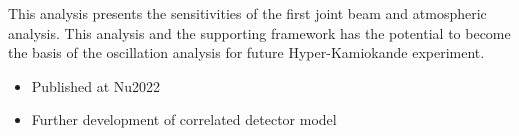 This analysis presents the sensitivities of the first joint beam and atmospheric analysis. This analysis and the supporting framework has the potential to become the basis of the oscillation analysis for future Hyper-Kamiokande experiment.

\begin{itemize}
\item Published at Nu2022
  
\item Further development of correlated detector model

\end{itemize}
